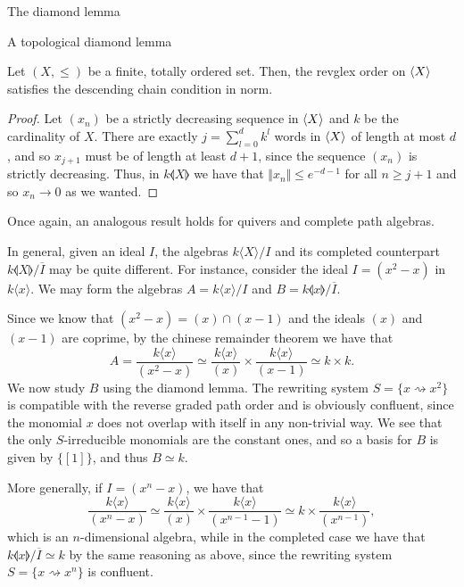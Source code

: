 \begin{chapter}{The diamond lemma}
\begin{section}{A topological diamond lemma}
\begin{lemma}\label{noeth-norm}Let $(X,\leq)$ be a finite, totally ordered set. Then, the revglex order on $\langle X\rangle$ satisfies the descending chain condition in norm.
\end{lemma}
\begin{proof} Let $(x_n)$ be a strictly decreasing sequence in $\langle X\rangle$ and $k$ be the cardinality of $X$. There are exactly $j=\sum_{l=0}^d k^l$ words in $\langle X\rangle$ of length at most $d$, and so $x_{j+1}$ must be of length at least $d+1$, since the sequence $(x_n)$ is strictly decreasing. Thus, in $k\llangle X\rrangle$ we have that $\Vert x_{n}\Vert\leq e^{-d-1}$ for all $n\geq j+1$ and so $x_n\rightarrow 0$ as we wanted.
\end{proof}

Once again, an analogous result holds for quivers and complete path algebras.

\begin{exmp} In general, given an ideal $I$, the algebras $k\langle X\rangle/I$ and its completed counterpart $k\llangle X\rrangle/\overline{I}$ may be quite different. For instance, consider the ideal $I=(x^2-x)$ in $k\langle x \rangle$. We may form the algebras $A=k\langle x\rangle/I$ and $B=k\llangle x\rrangle/\overline{I}$.

Since we know that $(x^2-x)=(x)\cap(x-1)$ and the ideals $(x)$ and $(x-1)$ are coprime, by the chinese remainder theorem we have that
\[A=\frac{k\langle x\rangle}{(x^2-x)}\simeq \frac{k\langle x\rangle}{(x)} \times \frac{k\langle x\rangle}{(x-1)}\simeq k\times k.\]
We now study $B$ using the diamond lemma. The rewriting system $S=\{x\rightsquigarrow x^2\}$ is compatible with the reverse graded path order and is obviously confluent, since the monomial $x$ does not overlap with itself in any non-trivial way. We see that the only $S$-irreducible monomials are the constant ones, and so a basis for $B$ is given by $\{[1]\}$, and thus $B\simeq k$.

More generally, if $I=(x^n-x)$, we have that
\[\frac{k\langle x\rangle}{(x^n-x)} \simeq \frac{k\langle x\rangle}{(x)}\times \frac{k\langle x\rangle}{(x^{n-1}-1)}\simeq k \times \frac{k\langle x\rangle}{(x^{n-1})},\]
which is an $n$-dimensional algebra, while in the completed case we have that $k\llangle x\rrangle/\overline{I}\simeq k$ by the same reasoning as above, since the rewriting system $S=\{x\rightsquigarrow x^n\}$ is confluent.
\end{exmp}
\end{section}
\end{chapter}